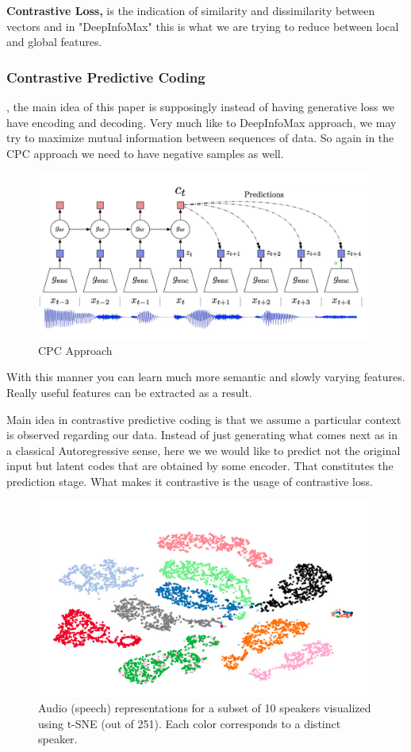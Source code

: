 \documentclass{article}
\begin{document}
 
\textbf{Contrastive Loss,} is the indication of similarity and dissimilarity between
vectors and in "DeepInfoMax" this is what we are trying to reduce between local
and global features.
 
\subsubsection{Contrastive Predictive Coding}
\cite{DBLP:journals/corr/abs-1807-03748}, the main idea of this paper is
supposingly instead of having generative loss we have encoding and decoding.
Very much like to DeepInfoMax approach, we may try to maximize mutual information
between sequences of data. So again in the CPC approach we need to have negative samples as well.
 
\begin{figure}[H]
   \centering
   \includegraphics[width=0.8\linewidth]{figures/cpc.png}
   \caption{CPC Approach}
   \label{fig:cpc}
\end{figure}
 
With this manner you can learn much more semantic and slowly varying features.
Really useful features can be extracted as a result.
 
Main idea in contrastive predictive coding is that we assume a particular
context is observed regarding our data.
Instead of just generating what comes next as in a classical Autoregressive
sense, here we we would like to predict not the original input but
latent codes that are obtained by some encoder. That constitutes the prediction stage.
What makes it contrastive is the usage of contrastive loss.
 
\begin{figure}[H]
   \centering
   \includegraphics[width=0.8\linewidth]{figures/tsne_cpc_speech.png}
   \caption{Audio (speech) representations for
   a subset of 10 speakers visualized using t-SNE (out of 251).
   Each color corresponds to a distinct speaker. }
   \label{fig:cpc_speech}
\end{figure}
 
\end{document}
